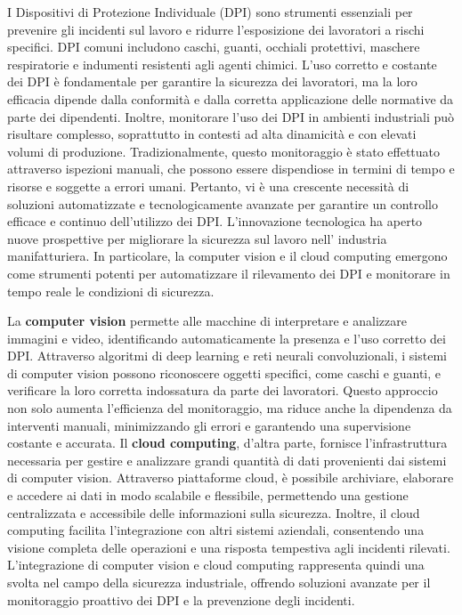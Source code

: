I Dispositivi di Protezione Individuale (DPI) sono strumenti essenziali per prevenire gli incidenti sul lavoro e ridurre l'esposizione dei lavoratori a rischi specifici. DPI comuni includono caschi, guanti, occhiali protettivi, maschere respiratorie e indumenti resistenti agli agenti chimici. L'uso corretto e costante dei DPI è fondamentale per garantire la sicurezza dei lavoratori, ma la loro efficacia dipende dalla conformità e dalla corretta applicazione delle normative da parte dei dipendenti. Inoltre, monitorare l'uso dei DPI in ambienti industriali può risultare complesso, soprattutto in contesti ad alta dinamicità e con elevati volumi di produzione. Tradizionalmente, questo monitoraggio è stato effettuato attraverso ispezioni manuali, che possono essere dispendiose in termini di tempo e risorse e soggette a errori umani. Pertanto, vi è una crescente necessità di soluzioni automatizzate e tecnologicamente avanzate per garantire un controllo efficace e continuo dell'utilizzo dei DPI. L'innovazione tecnologica ha aperto nuove prospettive per migliorare la sicurezza sul lavoro nell' industria manifatturiera. In particolare, la computer vision e il cloud computing emergono come strumenti potenti per automatizzare il rilevamento dei DPI e monitorare in tempo reale le condizioni di sicurezza.

La {\bfseries computer vision} permette alle macchine di interpretare e analizzare immagini e video, identificando automaticamente la presenza e l'uso corretto dei DPI. Attraverso algoritmi di deep learning e reti neurali convoluzionali, i sistemi di computer vision possono riconoscere oggetti specifici, come caschi e guanti, e verificare la loro corretta indossatura da parte dei lavoratori. Questo approccio non solo aumenta l'efficienza del monitoraggio, ma riduce anche la dipendenza da interventi manuali, minimizzando gli errori e garantendo una supervisione costante e accurata. Il {\bfseries cloud computing}, d'altra parte, fornisce l'infrastruttura necessaria per gestire e analizzare grandi quantità di dati provenienti dai sistemi di computer vision. Attraverso piattaforme cloud, è possibile archiviare, elaborare e accedere ai dati in modo scalabile e flessibile, permettendo una gestione centralizzata e accessibile delle informazioni sulla sicurezza. Inoltre, il cloud computing facilita l'integrazione con altri sistemi aziendali, consentendo una visione completa delle operazioni e una risposta tempestiva agli incidenti rilevati. L'integrazione di computer vision e cloud computing rappresenta quindi una svolta nel campo della sicurezza industriale, offrendo soluzioni avanzate per il monitoraggio proattivo dei DPI e la prevenzione degli incidenti. 

